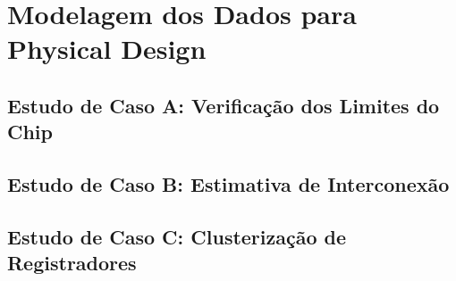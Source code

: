 \section{Modelagem dos Dados para Physical Design}
\label{sec:modelagem_physical_design}

\subsection{Estudo de Caso A\@: Verificação dos Limites do Chip}
\label{subsec:problema_A}

\subsection{Estudo de Caso B\@: Estimativa de Interconexão}
\label{subsec:problema_B}

\subsection{Estudo de Caso C\@: Clusterização de Registradores}
\label{subsec:problema_C}


